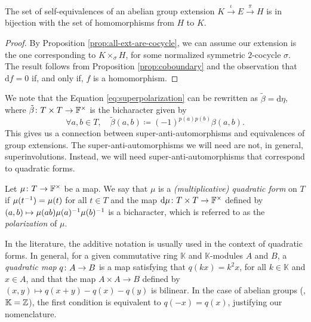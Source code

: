 \begin{cor}%
    The set of self-equivalences of an abelian group extension $K \xrightarrow{\iota} E \xrightarrow{\pi} H$ is in bijection with the set of homomorphisms from $H$ to $K$.
\end{cor}

\begin{proof}
    By Proposition \ref{prop:all-ext-are-cocycle}, we can assume our extension is the one corresponding to $K \times_\sigma H$, for some normalized symmetric $2$-cocycle $\sigma$. 
    The result follows from Proposition \ref{prop:coboundary} and the observation that $\mathrm{d}f = 0$ if, and only if, $f$ is a homomorphism. 
\end{proof}

We note that the Equation \eqref{eq:superpolarization} can be rewritten as $\tilde\beta = \mathrm{d}\eta$, where $\tilde\beta\colon T\times T \to \mathbb{F}^\times$ is the bicharacter given by
\begin{equation}%
    \forall a,b\in T,\quad \tilde\beta(a,b) \coloneqq (-1)^{p(a)p(b)}\beta(a,b).
\end{equation}
This gives us a connection between super-anti-automorphisms and equivalences of group extensions. 
The super-anti-automorphisms we will need are not, in general, superinvolutions. 
Instead, we will need super-anti-automorphisms that correspond to quadratic forms.

\begin{defi}
    Let $\mu\colon T \to \mathbb{F}^\times$ be a map. 
    We say that $\mu$ is a \emph{(multiplicative) quadratic form} on $T$ if $\mu(t^{-1}) = \mu (t)$ for all $t\in T$ and the map $\mathrm{d}\mu\colon T\times T \to \mathbb{F}^\times$ defined by
    $(a,b) \mapsto \mu(ab) \mu(a)^{-1} \mu(b)^{-1}$
    is a bicharacter, which is referred to as the \emph{polarization} of $\mu$.
\end{defi}

\begin{remark}
    In the literature, the additive notation is usually used in the context of quadratic forms. 
    In general, for a given commutative ring $\mathbb K$ and $\mathbb K$-modules $A$ and $B$, a \emph{quadratic map} $q\colon A \to B$ is a map satisfying that $q(kx) = k^2 x$, for all $k\in \mathbb K$ and $x \in A$, and that the map $A \times A \to B$ defined by $(x,y) \mapsto q(x+y) - q(x) - q(y)$ is bilinear. 
    In the case of abelian groups (\ie, $\mathbb K = \mathbb{Z}$), the first condition is equivalent to $q(-x) = q(x)$, justifying our nomenclature.
\end{remark}

